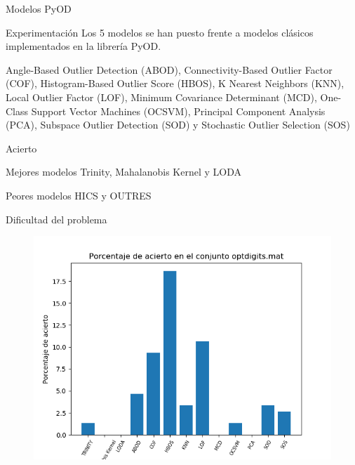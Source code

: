 \documentclass[10pt]{beamer}
\begin{document}
\begin{frame}[fragile]{Modelos PyOD}
\vspace{10px}

\begin{block}{Experimentación}
	Los 5 modelos se han puesto frente a modelos clásicos implementados en la librería PyOD.
	
	\pause
	
	Angle-Based Outlier Detection (ABOD), Connectivity-Based Outlier Factor (COF), Histogram-Based Outlier Score (HBOS), K Nearest Neighbors (KNN), Local Outlier Factor (LOF), Minimum Covariance Determinant (MCD), One-Class Support Vector Machines (OCSVM), Principal Component Analysis (PCA), Subspace Outlier Detection (SOD) y Stochastic Outlier Selection (SOS)
\end{block}

\end{frame}

\begin{frame}[fragile]{Acierto}
\vspace{10px}

\begin{alertblock}{Mejores modelos}
	Trinity, Mahalanobis Kernel y LODA
\end{alertblock}

\pause

\begin{alertblock}{Peores modelos}
	HICS y OUTRES
\end{alertblock}

\end{frame}

\begin{frame}[fragile]{Dificultad del problema}
\vspace{10px}

\begin{figure}
	\centering
	\includegraphics[scale=0.6]{Imagenes/optdigits-score}
\end{figure}

\end{frame}
\end{document}
